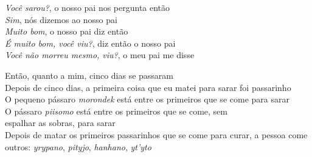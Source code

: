 \bigskip

\begin{linenumbers}
 
\noindent \textit{Você sarou?}, o nosso pai nos pergunta então\\
 \textit{Sim}, nós dizemos ao nosso pai\\
 \textit{Muito bom}, o nosso pai diz então\\
 \textit{É muito bom, você viu?}, diz então o nosso pai\\
 \textit{Você não morreu mesmo, viu?}, o meu pai me disse
 
\end{linenumbers}

\bigskip

\begin{linenumbers}
 
\noindent Então, quanto a mim, cinco dias se passaram\\
 Depois de cinco dias, a primeira coisa que eu matei para sarar foi passarinho\\
 O pequeno pássaro \textit{morondek} está entre os primeiros que se come para sarar\\
 O pássaro \textit{piisomo} está entre os primeiros que se come, sem\\
 espalhar as sobras, para sarar\\
 Depois de matar os primeiros passarinhos que se come para curar, a
 pessoa come outros: \textit{yrypano}, \textit{pityjo}, \textit{hanhano},
 \textit{yt'yto}
 
\end{linenumbers}

\bigskip

